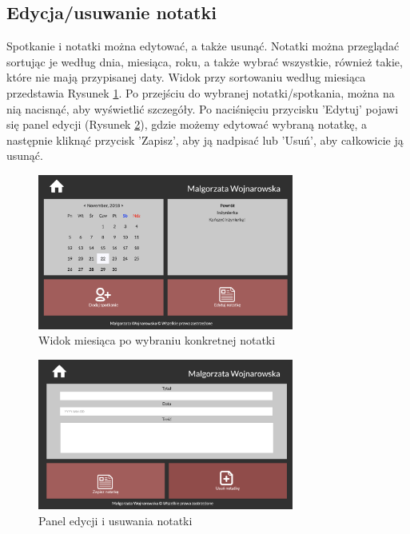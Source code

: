 \documentclass[eng,printmode,openany,oneside]{mgr}
\begin{document}
	
	
	
	
	
	
	
\newpage
	
	
	
	
	

\subsection{Edycja/usuwanie notatki}

Spotkanie i notatki można edytować, a także usunąć. Notatki można przeglądać sortując je według dnia, miesiąca, roku, a także wybrać wszystkie, również takie, które nie mają przypisanej daty. Widok przy sortowaniu według miesiąca przedstawia Rysunek \ref{fig:17}. Po przejściu do wybranej notatki/spotkania, można na nią nacisnąć, aby wyświetlić szczegóły. Po naciśnięciu przycisku ’Edytuj’ pojawi się panel edycji (Rysunek \ref{fig:18}), gdzie możemy edytować wybraną notatkę, a następnie kliknąć przycisk ’Zapisz’, aby ją nadpisać lub 'Usuń', aby całkowicie ją usunąć.

	\begin{figure}[H]
		\centering
		\includegraphics[width=0.75\textwidth]{miesiac_notatka}
		\caption{Widok miesiąca po wybraniu konkretnej notatki}
		\label{fig:17}
	\end{figure}
	
	
	\begin{figure}[H]
		\centering
		\includegraphics[width=0.75\textwidth]{edycja_notatka}
		\caption{Panel edycji i usuwania notatki}
		\label{fig:18}
	\end{figure}
	
\end{document}
